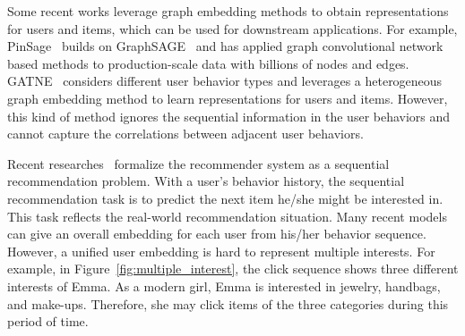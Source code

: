 Some recent works leverage graph embedding methods to obtain representations for users and items, which can be used for downstream applications. For example, PinSage~\cite{ying2018graph} builds on GraphSAGE~\cite{hamilton2017inductive} and has applied graph convolutional network based methods to production-scale data with billions of nodes and edges. GATNE~\cite{cen2019representation} considers different user behavior types and leverages a heterogeneous graph embedding method to learn representations for users and items. However, this kind of method ignores the sequential information in the user behaviors and cannot capture the correlations between adjacent user behaviors. %

Recent researches~\cite{kang2018self,chen2018sequential,lv2019sdm} formalize the recommender system as a sequential recommendation problem. With a user's behavior history, the sequential recommendation task is to predict the next item he/she might be interested in. This task reflects the real-world recommendation situation. Many recent models can give an overall embedding for each user from his/her behavior sequence. However, a unified user embedding is hard to represent multiple interests. For example, in Figure~\ref{fig:multiple_interest}, the click sequence shows three different interests of Emma. As a modern girl, Emma is interested in jewelry, handbags, and make-ups. Therefore, she may click items of the three categories during this period of time. 


